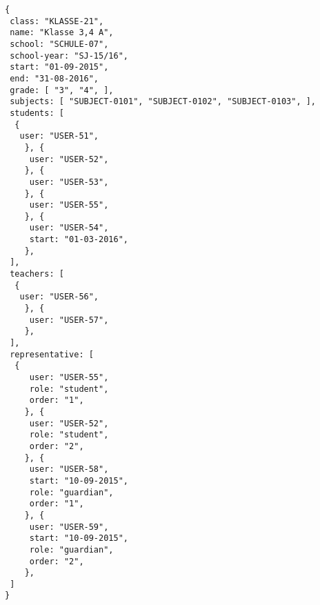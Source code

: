 
\begin{lstlisting}[caption={Klassen Datenmodel Beispiel 3: Jagangsübergreifende Klasse},frame=tlrb]
{
 class: "KLASSE-21",
 name: "Klasse 3,4 A",
 school: "SCHULE-07",
 school-year: "SJ-15/16",
 start: "01-09-2015",
 end: "31-08-2016",
 grade: [ "3", "4", ],
 subjects: [ "SUBJECT-0101", "SUBJECT-0102", "SUBJECT-0103", ],
 students: [
  { 
   user: "USER-51",
	}, { 
	 user: "USER-52",
	}, { 
	 user: "USER-53",
	}, { 
	 user: "USER-55",
	}, { 
	 user: "USER-54",
	 start: "01-03-2016",
	},
 ],
 teachers: [
  { 
   user: "USER-56",
	}, { 
	 user: "USER-57",
	},
 ],
 representative: [
  {
	 user: "USER-55",
	 role: "student",
	 order: "1",	 
	}, {
	 user: "USER-52",
	 role: "student",
	 order: "2",	 
	}, {
	 user: "USER-58",
	 start: "10-09-2015",
	 role: "guardian",
	 order: "1",	 
	}, {
	 user: "USER-59",
	 start: "10-09-2015",
	 role: "guardian",
	 order: "2",	 
	},  
 ]
}
\end{lstlisting}